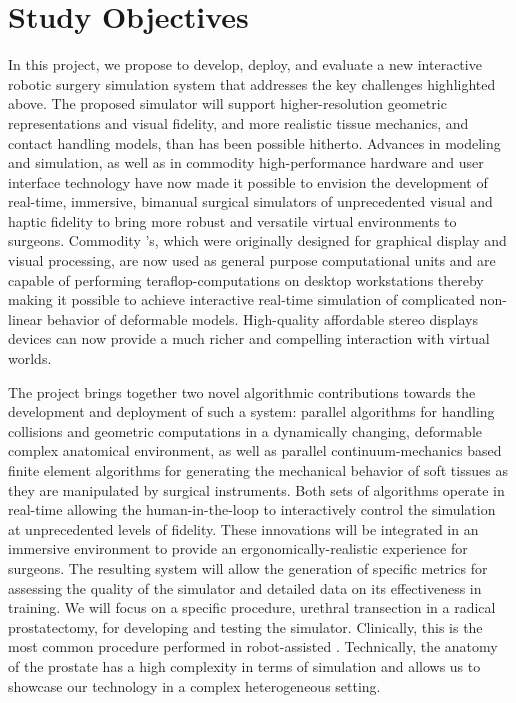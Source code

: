 \section{Study Objectives}
\label{sec:objectives}
In this project, we propose to develop, deploy, and evaluate a new interactive robotic surgery simulation system that addresses the key challenges highlighted above. The proposed simulator will support higher-resolution geometric representations and visual fidelity, and more realistic tissue mechanics, and contact handling models, than has been possible hitherto. Advances in modeling and simulation, as well as in commodity high-performance hardware and user interface technology have now made it possible to envision the development of real-time, immersive, bimanual surgical simulators of unprecedented visual and haptic fidelity to bring more robust and versatile virtual environments to surgeons. Commodity 's, which were originally designed for graphical display and visual processing, are now used as general purpose computational units and are capable of performing teraflop-computations on desktop workstations thereby making it possible to achieve interactive real-time simulation of complicated non-linear behavior of deformable models. High-quality affordable stereo displays devices can now provide a much richer and compelling interaction with virtual worlds.

The project brings together two novel algorithmic contributions towards the development and deployment of such a system: parallel  algorithms for handling collisions and geometric computations in a dynamically changing, deformable complex anatomical environment, as well as parallel continuum-mechanics based finite element algorithms for generating the mechanical behavior of soft tissues as they are manipulated by surgical instruments. Both sets of algorithms operate in real-time allowing the human-in-the-loop to interactively control the simulation at unprecedented levels of fidelity. These innovations will be integrated in an immersive environment to provide an ergonomically-realistic experience for surgeons. The resulting system will allow the generation of specific metrics for assessing the quality of the simulator and detailed data on its effectiveness in training. We will focus on a specific procedure, urethral transection in a radical prostatectomy, for developing and testing the simulator. Clinically, this is the most common procedure performed in robot-assisted . Technically, the anatomy of the prostate has a high complexity in terms of simulation and allows us to showcase our technology in a complex heterogeneous setting.

